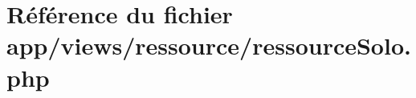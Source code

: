 \hypertarget{ressource_solo_8php}{}\section{Référence du fichier app/views/ressource/ressource\+Solo.php}
\label{ressource_solo_8php}
